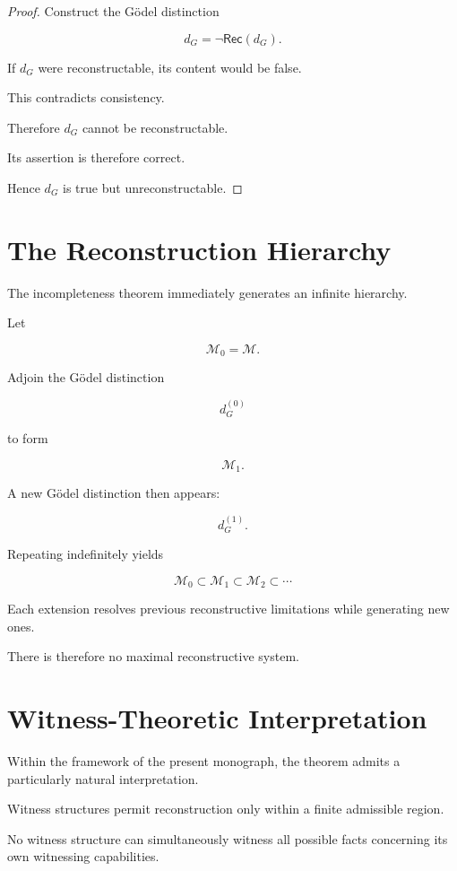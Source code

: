\documentclass[12pt,oneside]{book}
\theoremstyle{plain} \newtheorem{theorem}{Theorem}[chapter] \newtheorem{lemma}[theorem]{Lemma} \newtheorem{proposition}[theorem]{Proposition} \newtheorem{corollary}[theorem]{Corollary}
\theoremstyle{definition} \newtheorem{definition}[theorem]{Definition} \newtheorem{axiom}[theorem]{Axiom} \newtheorem{construction}[theorem]{Construction}
\theoremstyle{remark} \newtheorem{remark}[theorem]{Remark} \newtheorem{example}[theorem]{Example}
\begin{document}
\begin{proof}

Construct the Gödel distinction

\[
d_G
=
\neg\mathsf{Rec}(d_G).
\]

If $d_G$ were reconstructable, its content would be false.

This contradicts consistency.

Therefore $d_G$ cannot be reconstructable.

Its assertion is therefore correct.

Hence $d_G$ is true but unreconstructable.

\end{proof}

\section{The Reconstruction Hierarchy}

The incompleteness theorem immediately generates an infinite hierarchy.

Let

\[
\mathcal M_0
=
\mathcal M.
\]

Adjoin the Gödel distinction

\[
d_G^{(0)}
\]

to form

\[
\mathcal M_1.
\]

A new Gödel distinction then appears:

\[
d_G^{(1)}.
\]

Repeating indefinitely yields

\[
\mathcal M_0
\subset
\mathcal M_1
\subset
\mathcal M_2
\subset
\cdots
\]

Each extension resolves previous reconstructive limitations while generating new ones.

There is therefore no maximal reconstructive system.

\section{Witness-Theoretic Interpretation}

Within the framework of the present monograph, the theorem admits a particularly natural interpretation.

Witness structures permit reconstruction only within a finite admissible region.

No witness structure can simultaneously witness all possible facts concerning its own witnessing capabilities.
\end{document}
